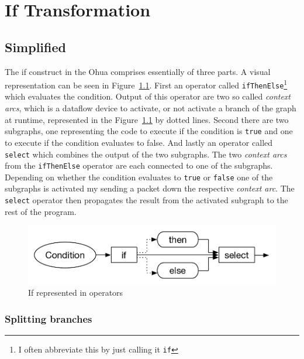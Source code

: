 \chapter{If Transformation}

\label{ch:if-transformation}

\newcommand{\opite}{\texttt{ifThenElse}}
\newcommand{\opselect}{\texttt{select}}


\section{Simplified}


The if construct in the Ohua comprises essentially of three parts.
A visual representation can be seen in Figure~\ref{fig:if-in-operators}.
First an operator called \texttt{ifThenElse}\footnote{I often abbreviate this by just calling it \texttt{if}} which evaluates the condition.
Output of this operator are two so called \emph{context arcs}, which is a dataflow device to activate, or not activate a branch of the graph at runtime, represented in the Figure~\ref{fig:if-in-operators} by dotted lines.
Second there are two subgraphs, one representing the code to execute if the condition is \texttt{true} and one to execute if the condition evaluates to false.
And lastly an operator called \texttt{select} which combines the output of the two subgraphs.
The two \emph{context arcs} from the \texttt{ifThenElse} operator are each connected to one of the subgraphs.
Depending on whether the condition evaluates to \texttt{true} or \texttt{false} one of the subgraphs is activated my sending a packet down the respective \emph{context arc}.
The \texttt{select} operator then propagates the result from the activated subgraph to the rest of the program.

\begin{figure}
    \includegraphics[width=\linewidth]{../Figures/if-in-operators}
    \caption{If represented in operators}
    \label{fig:if-in-operators}
\end{figure}

\subsection{Splitting branches}

